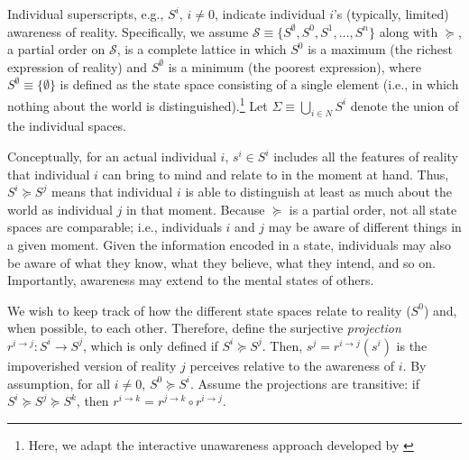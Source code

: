 \documentclass[
11pt,
titlepage,
reqno,
]{article}%
\theoremstyle{definition}
\begin{document}
	Individual superscripts, e.g., $S^i$, $i\ne 0$,  indicate individual $i$'s (typically, limited) awareness of reality.
	Specifically, we assume $\mathcal{S}\equiv \{S^\emptyset,S^0,S^1,\ldots,S^n\}$ along with $\succeq$, a partial order on $\mathcal{S}$, is a complete lattice in which $S^0$ is a maximum (the richest expression of reality) and $S^\emptyset$ is a minimum (the poorest expression), where $S^\emptyset\equiv\{\emptyset\}$ is defined as the state space consisting of a single element (i.e., in which nothing about the world is distinguished).\footnote
	{
		Here, we adapt the interactive unawareness approach developed by \cite{Heifetz2006
		}
	}
	Let $\Sigma\equiv\bigcup_{i\in N}S^i$ denote the union of the individual spaces.
	
	Conceptually, for an actual individual $i$, $s^i\in S^i$ includes all the features of reality that individual $i$ can bring to mind and relate to in the moment at hand.
	Thus, $S^i\succeq S^j$ means that individual $i$ is able to distinguish at least as much about the world as individual $j$ in that moment.
	Because $\succeq$ is a partial order, not all state spaces are comparable; i.e., individuals $i$ and $j$ may be aware of different things in a given moment.
	Given the information encoded in a state, individuals may also be aware of what they know, what they believe, what they intend, and so on. 
	Importantly, awareness may extend to the mental states of others. 


	We wish to keep track of how the different state spaces relate to reality ($S^0$) and, when possible, to each other. 
	Therefore, define the surjective \textit{projection} $r^{i\rightarrow j}:S^i\rightarrow S^j$, which is only defined if  $S^i\succeq S^j$.
	Then, $s^j=r^{i\rightarrow j}(s^i)$ is the impoverished version of reality $j$ perceives relative to the awareness of $i$. 
	By assumption, for all $i\ne 0$, $S^0\succeq S^i$.
	Assume the projections are transitive: if $S^i\succeq S^j\succeq S^k$, then $r^{i\rightarrow k}=r^{j\rightarrow k}\circ r^{i\rightarrow j}$.
\end{document}
